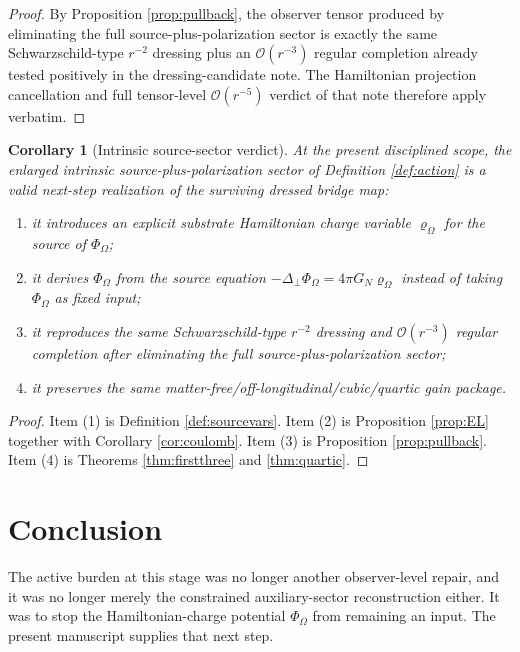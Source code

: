 \documentclass[11pt]{article}
\newcommand{\LapPerp}{\Delta_\perp}
\newcommand{\FlowPot}{\Phi_\Omega}
\newcommand{\SourceDensity}{\varrho_\Omega}
\newtheorem{corollary}{Corollary}
\begin{document}
\begin{proof}
By Proposition \ref{prop:pullback}, the observer tensor produced by eliminating the full source-plus-polarization sector is exactly the same Schwarzschild-type \(r^{-2}\) dressing plus an \(\mathcal O(r^{-3})\) regular completion already tested positively in the dressing-candidate note. The Hamiltonian projection cancellation and full tensor-level \(\mathcal O(r^{-5})\) verdict of that note therefore apply verbatim.
\end{proof}

\begin{corollary}[Intrinsic source-sector verdict]
\label{cor:verdict}
At the present disciplined scope, the enlarged intrinsic source-plus-polarization sector of Definition \ref{def:action} is a valid next-step realization of the surviving dressed bridge map:
\begin{enumerate}
    \item it introduces an explicit substrate Hamiltonian charge variable \(\SourceDensity\) for the source of \(\FlowPot\);
    \item it derives \(\FlowPot\) from the source equation \(-\LapPerp\FlowPot=4\pi G_N\SourceDensity\) instead of taking \(\FlowPot\) as fixed input;
    \item it reproduces the same Schwarzschild-type \(r^{-2}\) dressing and \(\mathcal O(r^{-3})\) regular completion after eliminating the full source-plus-polarization sector;
    \item it preserves the same matter-free/off-longitudinal/cubic/quartic gain package.
\end{enumerate}
\end{corollary}

\begin{proof}
Item (1) is Definition \ref{def:sourcevars}. Item (2) is Proposition \ref{prop:EL} together with Corollary \ref{cor:coulomb}. Item (3) is Proposition \ref{prop:pullback}. Item (4) is Theorems \ref{thm:firstthree} and \ref{thm:quartic}.
\end{proof}

\section{Conclusion}

The active burden at this stage was no longer another observer-level repair, and it was no longer merely the constrained auxiliary-sector reconstruction either. It was to stop the Hamiltonian-charge potential \(\FlowPot\) from remaining an input. The present manuscript supplies that next step.
\end{document}
